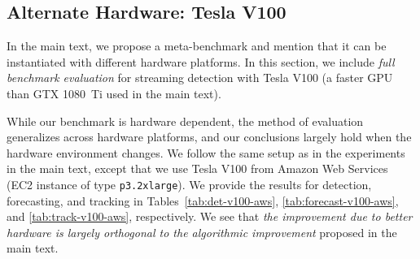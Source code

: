 \subsection{Alternate Hardware: Tesla V100}
\label{app:v100}

In the main text, we propose a meta-benchmark and mention that it can be instantiated with different hardware platforms. In this section, we include {\em full benchmark evaluation} for streaming detection with Tesla V100 (a faster GPU than GTX 1080~Ti used in the main text).

While our benchmark is hardware dependent, the method of evaluation generalizes across hardware platforms, and our conclusions largely hold when the hardware environment changes. We follow the same setup as in the experiments in the main text,
except that we use Tesla V100 from Amazon Web Services (EC2 instance of type \texttt{p3.2xlarge}). We provide the results for detection, forecasting, and tracking in Tables~\ref{tab:det-v100-aws}, \ref{tab:forecast-v100-aws}, and \ref{tab:track-v100-aws}, respectively. We see that {\em the improvement due to better hardware is largely orthogonal to the algorithmic improvement} proposed in the main text.

